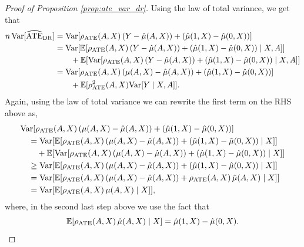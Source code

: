 \begin{proof}[Proof of Proposition \ref{prop:ate_var_dr}]
Using the law of total variance, we get that
\begin{align*}
    n\,\textup{Var}[\widehat{\textup{ATE}}_{\textup{DR}}] &= \textup{Var}[\rho_{\textup{ATE}}(A, X)\,(Y -\hat{\mu}(A, X)) + (\hat{\mu}(1, X) - \hat{\mu}(0, X))]\\
    &= \textup{Var}[ \mathbb{E}[\rho_{\textup{ATE}}(A, X)\,(Y -\hat{\mu}(A, X)) + (\hat{\mu}(1, X) - \hat{\mu}(0, X))\mid X, A]] \\
    &\qquad+ \mathbb{E}[\textup{Var}[\rho_{\textup{ATE}}(A, X)\,(Y -\hat{\mu}(A, X)) + (\hat{\mu}(1, X) - \hat{\mu}(0, X))\mid X, A]]\\
    &= \textup{Var}[ \rho_{\textup{ATE}}(A, X)\,(\mu(A, X) -\hat{\mu}(A, X)) + (\hat{\mu}(1, X) - \hat{\mu}(0, X))]\\
    &\qquad+ \mathbb{E}[\rho^2_{\textup{ATE}}(A, X)\textup{Var}[Y\mid X, A]].
\end{align*}
    Again, using the law of total variance we can rewrite the first term on the RHS above as,
    \begin{align*}
        &\textup{Var}[ \rho_{\textup{ATE}}(A, X)\,(\mu(A, X) -\hat{\mu}(A, X)) + (\hat{\mu}(1, X) - \hat{\mu}(0, X))]\\
        &\quad= \textup{Var}[\mathbb{E}[ \rho_{\textup{ATE}}(A, X)\,(\mu(A, X) -\hat{\mu}(A, X)) + (\hat{\mu}(1, X) - \hat{\mu}(0, X))\mid  X]] \\
        &\qquad+ \mathbb{E}[\textup{Var}[ \rho_{\textup{ATE}}(A, X)\,(\mu(A, X) -\hat{\mu}(A, X)) + (\hat{\mu}(1, X) - \hat{\mu}(0, X))\mid  X]] \\
        &\quad\geq  \textup{Var}[\mathbb{E}[ \rho_{\textup{ATE}}(A, X)\,(\mu(A, X) -\hat{\mu}(A, X)) + (\hat{\mu}(1, X) - \hat{\mu}(0, X))\mid  X]]\\
        &\quad=  \textup{Var}[\mathbb{E}[ \rho_{\textup{ATE}}(A, X)\,(\mu(A, X) -\hat{\mu}(A, X)) + \rho_{\textup{ATE}}(A, X)\,\hat{\mu}(A, X)\mid  X]]\\
        &\quad=  \textup{Var}[\mathbb{E}[ \rho_{\textup{ATE}}(A, X)\,\mu(A, X)\mid  X]],
    \end{align*}
    where, in the second last step above we use the fact that 
    \[
    \mathbb{E}[\rho_{\textup{ATE}}(A, X)\,\hat{\mu}(A, X)\mid  X] = \hat{\mu}(1, X) - \hat{\mu}(0, X).
    \]


\end{proof}
